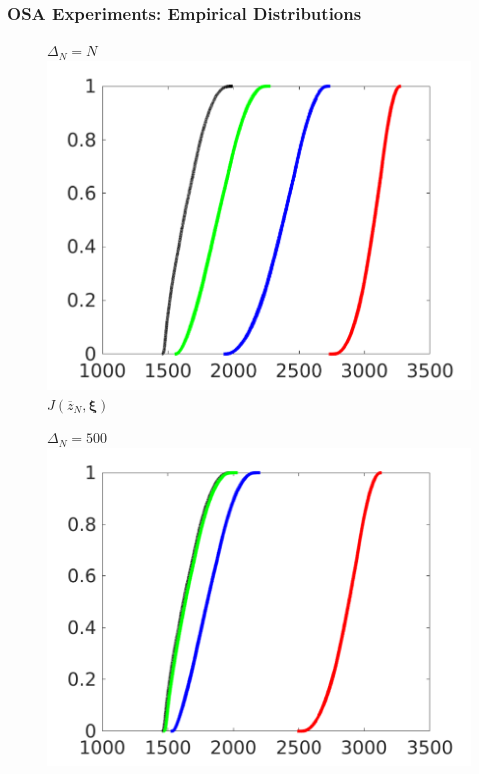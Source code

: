 \documentclass[aspectratio=169,xcolor=dvipsnames,11pt]{beamer}
\newcommand{\xibold}{\mathbold{\xi}}
\begin{document}
\begin{footnotesize}
\begin{frame}\frametitle{OSA Experiments: Empirical Distributions}
\begin{figure}[!ht]
\begin{minipage}{0.49\textwidth}
  \centering
  $\Delta_N = N$ \\
  \includegraphics[width=\textwidth]{figures/objective_cdf}\\
  $J(\overline{z}_N,\xibold)$
\end{minipage}
\begin{minipage}{0.49\textwidth}
  \centering
  $\Delta_N = 500$ \\
  \includegraphics[width=\textwidth]{figures/objective_cdf_delta500}\\

\end{minipage}
\end{figure}
\end{frame}
\end{footnotesize}
\end{document}
